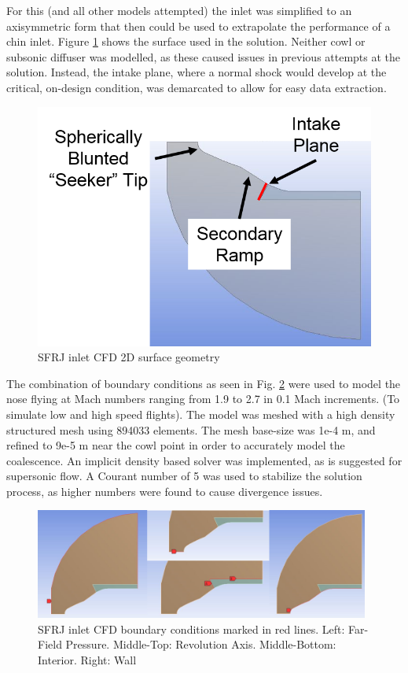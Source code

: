 For this (and all other models attempted) the inlet was simplified to an axisymmetric form that then could be used to extrapolate the performance of a chin inlet. Figure \ref{fig:InletCFDGeom} shows the surface used in the solution. Neither cowl or subsonic diffuser was modelled, as these caused issues in previous attempts at the solution. Instead, the intake plane, where a normal shock would develop at the critical, on-design condition, was demarcated to allow for easy data extraction.

\begin{figure}[H]
\centering
\includegraphics[width=.65\textwidth]{JWE_Figures/Nose_CFD_Surf.png}
\caption{SFRJ inlet CFD 2D surface geometry}
\label{fig:InletCFDGeom}
\end{figure}

The combination of boundary conditions as seen in Fig. \ref{fig:InletCFDBC} were used to model the nose flying at Mach numbers ranging from 1.9 to 2.7 in 0.1 Mach increments. (To simulate low and high speed flights). The model was meshed with a high density structured mesh using 894033 elements. The mesh base-size was 1e-4 m, and refined to 9e-5 m near the cowl point in order to accurately model the coalescence. An implicit density based solver was implemented, as is suggested for supersonic flow. A Courant number of 5 was used to stabilize the solution process, as higher numbers were found to cause divergence issues. 

\begin{figure}[H]
\centering
\includegraphics[width=0.98\textwidth]{JWE_Figures/CFD_BC_Group.png}
\caption{SFRJ inlet CFD boundary conditions marked in red lines. Left: Far-Field Pressure. Middle-Top: Revolution Axis. Middle-Bottom: Interior. Right: Wall}
\label{fig:InletCFDBC}
\end{figure}


